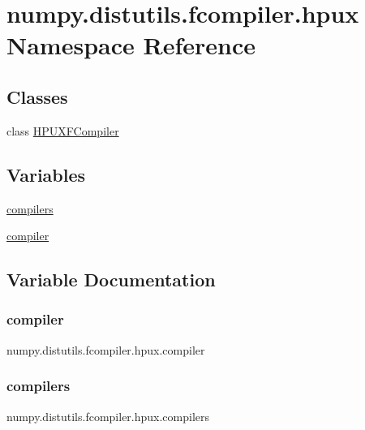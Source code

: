\hypertarget{namespacenumpy_1_1distutils_1_1fcompiler_1_1hpux}{}\section{numpy.\+distutils.\+fcompiler.\+hpux Namespace Reference}
\label{namespacenumpy_1_1distutils_1_1fcompiler_1_1hpux}
\subsection*{Classes}
\begin{DoxyCompactItemize}
\item 
class \hyperlink{classnumpy_1_1distutils_1_1fcompiler_1_1hpux_1_1HPUXFCompiler}{H\+P\+U\+X\+F\+Compiler}
\end{DoxyCompactItemize}
\subsection*{Variables}
\begin{DoxyCompactItemize}
\item 
\hyperlink{namespacenumpy_1_1distutils_1_1fcompiler_1_1hpux_a8b9df93e4e9a4add26db4d1e935d966b}{compilers}
\item 
\hyperlink{namespacenumpy_1_1distutils_1_1fcompiler_1_1hpux_a1a16c9ec38f9336d553dc849563af92e}{compiler}
\end{DoxyCompactItemize}


\subsection{Variable Documentation}
\mbox{\label{namespacenumpy_1_1distutils_1_1fcompiler_1_1hpux_a1a16c9ec38f9336d553dc849563af92e}} 
\subsubsection{\texorpdfstring{compiler}{compiler}}
{\footnotesize\ttfamily numpy.\+distutils.\+fcompiler.\+hpux.\+compiler}

\mbox{\label{namespacenumpy_1_1distutils_1_1fcompiler_1_1hpux_a8b9df93e4e9a4add26db4d1e935d966b}} 
\subsubsection{\texorpdfstring{compilers}{compilers}}
{\footnotesize\ttfamily numpy.\+distutils.\+fcompiler.\+hpux.\+compilers}

